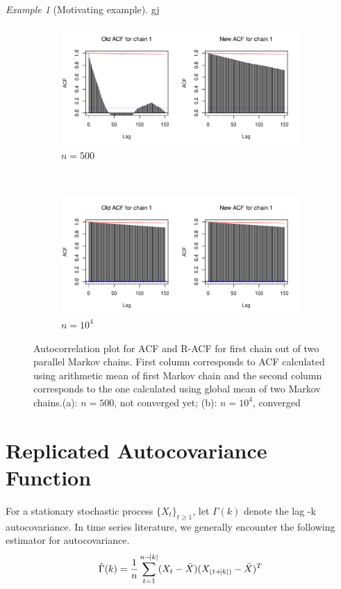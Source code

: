 \documentclass[12pt]{article}
\theoremstyle{remark}
\newtheorem{example}{Example}
\begin{document}
\begin{example}[Motivating example]
  gj
\begin{figure}
\begin{subfigure}{\textwidth}
  \centering
  \includegraphics[width=.8\linewidth]{plots/acf,n=500.pdf}
  \caption{$n = 500$}
  \label{subfig:acf-500}
\end{subfigure}\\
\begin{subfigure}{\textwidth}
  \centering
  \includegraphics[width=.8\linewidth]{plots/acf,n=10000.pdf} 
  \caption{$n = 10^4$}
  \label{subfig:acf-5e4}
\end{subfigure}
\caption{Autocorrelation plot for ACF and R-ACF for first chain out of two parallel Markov chains. First column corresponds to ACF calculated using arithmetic mean of first Markov chain and the second column corresponds to the one calculated using global mean of two Markov chains.(a): $n = 500$, not converged yet; (b): $n =  10^4$, converged}
\label{fig:var_acf_ccf}
\end{figure}

\end{example}
\section{Replicated Autocovariance Function} \label{sec:R-ACF}

For a stationary stochastic process $\{X_t\}_{t \geq 1}$, let $\Gamma(k)$ denote the lag -k autocovariance. In time series literature, we generally encounter the following estimator for autocovariance. 
%
\[
\hat{\Gamma}(k) = \dfrac{1}{n}\sum_{t=1}^{n-\abs{k}}(X_t - \bar{X})(X_{(t+\abs{k})} - \bar{X})^T
\]
\end{document}

